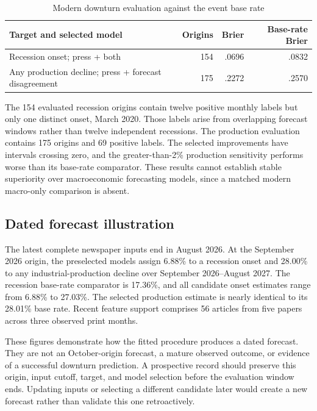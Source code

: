\begin{table}[t]
\caption{Modern downturn evaluation against the event base rate}\label{tab:downturn}
\centering\small
\begin{tabularx}{\linewidth}{Xrrr}
\toprule
Target and selected model & Origins & Brier & Base-rate Brier\\
\midrule
Recession onset; press + both & 154 & .0696 & .0832\\
Any production decline; press + forecast disagreement & 175 & .2272 & .2570\\
\bottomrule
\end{tabularx}
\end{table}

The 154 evaluated recession origins contain twelve positive monthly labels but only one distinct onset, March 2020. Those labels arise from overlapping forecast windows rather than twelve independent recessions. The production evaluation contains 175 origins and 69 positive labels. The selected improvements have intervals crossing zero, and the greater-than-2\% production sensitivity performs worse than its base-rate comparator. These results cannot establish stable superiority over macroeconomic forecasting models, since a matched modern macro-only comparison is absent.

\subsection{Dated forecast illustration}
The latest complete newspaper inputs end in August 2026. At the September 2026 origin, the preselected models assign 6.88\% to a recession onset and 28.00\% to any industrial-production decline over September 2026--August 2027. The recession base-rate comparator is 17.36\%, and all candidate onset estimates range from 6.88\% to 27.03\%. The selected production estimate is nearly identical to its 28.01\% base rate. Recent feature support comprises 56 articles from five papers across three observed print months.

These figures demonstrate how the fitted procedure produces a dated forecast. They are not an October-origin forecast, a mature observed outcome, or evidence of a successful downturn prediction. A prospective record should preserve this origin, input cutoff, target, and model selection before the evaluation window ends. Updating inputs or selecting a different candidate later would create a new forecast rather than validate this one retroactively.

